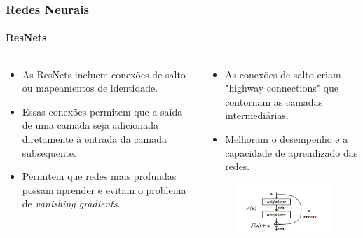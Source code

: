 \documentclass{beamer}
\begin{document}
	\begin{frame}
		\frametitle{Redes Neurais}
		\framesubtitle{ResNets}
		\begin{columns}[t]
			\begin{column}{0.5\textwidth}
				\begin{itemize}
					\item As ResNets incluem conexões de salto ou mapeamentos de identidade.
					\item Essas conexões permitem que a saída de uma camada seja adicionada diretamente à entrada da camada subsequente.
					\item Permitem que redes mais profundas possam aprender e evitam o problema de \textit{vanishing gradients}.
				\end{itemize}
			\end{column}
			\begin{column}{0.5\textwidth}
				\begin{itemize}
					\item As conexões de salto criam "highway connections" que contornam as camadas intermediárias.
					\item Melhoram o desempenho e a capacidade de aprendizado das redes.
				\end{itemize}
				\begin{figure}
					\centering
					\includegraphics[width=\linewidth]{../monografia/images/residualBlock}
					\label{fig:residualblock}
				\end{figure}
			\end{column}
		\end{columns}
	\end{frame}
	
\end{document}
